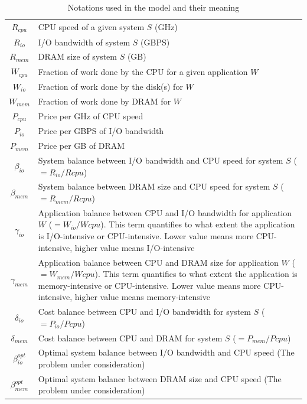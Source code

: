 \documentclass[journal]{IEEEtran}
\begin{document}
\begin{table}[!t]
\caption{Notations used in the model and their meaning}
\label{tab:Notation}
\centering
\begin{tabular}{|c|p{7cm}|}
\hline
$R_{cpu}$ & CPU speed of a given system $S$ (GHz)\\
$R_{io}$ &  I/O bandwidth of system $S$ (GBPS)\\
$R_{mem}$ & DRAM size of system $S$ (GB)\\
\hline
$W_{cpu}$ & Fraction of work done by the CPU for a given application $W$\\
$W_{io}$ & Fraction of work done by the disk(s) for $W$\\
$W_{mem}$ & Fraction of work done by DRAM for $W$\\
\hline
$P_{cpu}$ & Price per GHz of CPU speed\\
$P_{io}$ & Price per GBPS of I/O bandwidth\\
$P_{mem}$ & Price per GB of DRAM\\
\hline
\hline
$\beta_{io}$ & System balance between I/O bandwidth and CPU speed for system $S$ ($= R_{io}/R{cpu}$)\\
$\beta_{mem}$ & System balance between DRAM size and CPU speed for system $S$ ($= R_{mem}/R{cpu}$)\\
\hline
$\gamma_{io}$ & Application balance between CPU and I/O bandwidth for application $W$ ($= W_{io}/W{cpu}$). This term quantifies to what extent the application is I/O-intensive or CPU-intensive. Lower value means more CPU-intensive, higher value means I/O-intensive \\
$\gamma_{mem}$ & Application balance between CPU and DRAM size for application $W$ ($= W_{mem}/W{cpu}$). This term quantifies to what extent the application is memory-intensive or CPU-intensive. Lower value means more CPU-intensive, higher value means memory-intensive \\
\hline
$\delta_{io}$ & Cost balance between CPU and I/O bandwidth for system $S$ ($= P_{io}/P{cpu}$)\\
$\delta_{mem}$ & Cost balance between CPU and DRAM for system $S$ ($= P_{mem}/P{cpu}$)\\
\hline
\hline
$\beta_{io}^{opt}$ & Optimal system balance between I/O bandwidth and CPU speed (The problem under consideration)\\
$\beta_{mem}^{opt}$ & Optimal system balance between DRAM size and CPU speed (The problem under consideration)\\
\hline
\end{tabular}
\end{table}
\end{document}
